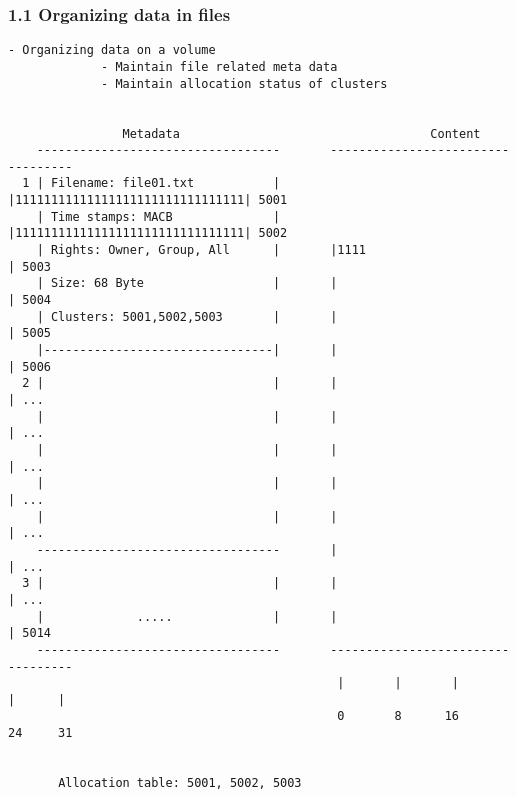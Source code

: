\begin{frame}[fragile]
  \frametitle{1.1 Organizing data in files}
  \begin{lstlisting}[basicstyle=\tiny\ttfamily]
             - Organizing data on a volume
             - Maintain file related meta data
             - Maintain allocation status of clusters
                            

                Metadata                                   Content     
    ----------------------------------       ----------------------------------
  1 | Filename: file01.txt           |       |11111111111111111111111111111111| 5001
    | Time stamps: MACB              |       |11111111111111111111111111111111| 5002
    | Rights: Owner, Group, All      |       |1111                            | 5003
    | Size: 68 Byte                  |       |                                | 5004
    | Clusters: 5001,5002,5003       |       |                                | 5005
    |--------------------------------|       |                                | 5006
  2 |                                |       |                                | ...
    |                                |       |                                | ...
    |                                |       |                                | ...
    |                                |       |                                | ...
    |                                |       |                                | ...
    ----------------------------------       |                                | ...
  3 |                                |       |                                | ...
    |             .....              |       |                                | 5014
    ----------------------------------       ----------------------------------
                                              |       |       |       |      |
                                              0       8      16      24     31


       Allocation table: 5001, 5002, 5003
  \end{lstlisting}
\end{frame}



